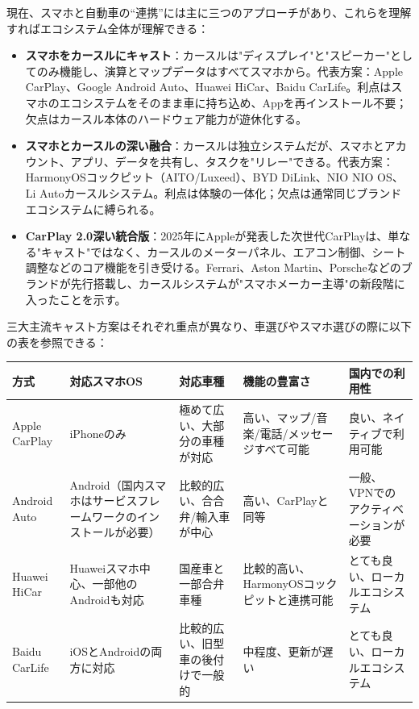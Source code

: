 


現在、スマホと自動車の“連携”には主に三つのアプローチがあり、これらを理解すればエコシステム全体が理解できる：

\begin{itemize}
  \item \textbf{スマホをカースルにキャスト}：カースルは"ディスプレイ"と"スピーカー"としてのみ機能し、演算とマップデータはすべてスマホから。代表方案：Apple CarPlay、Google Android Auto、Huawei HiCar、Baidu CarLife。利点はスマホのエコシステムをそのまま車に持ち込め、Appを再インストール不要；欠点はカースル本体のハードウェア能力が遊休化する。
  \item \textbf{スマホとカースルの深い融合}：カースルは独立システムだが、スマホとアカウント、アプリ、データを共有し、タスクを"リレー"できる。代表方案：HarmonyOSコックピット（AITO/Luxeed）、BYD DiLink、NIO NIO OS、Li Autoカースルシステム。利点は体験の一体化；欠点は通常同じブランドエコシステムに縛られる。
  \item \textbf{CarPlay 2.0深い統合版}：2025年にAppleが発表した次世代CarPlayは、単なる"キャスト"ではなく、カースルのメーターパネル、エアコン制御、シート調整などのコア機能を引き受ける。Ferrari、Aston Martin、Porscheなどのブランドが先行搭載し、カースルシステムが"スマホメーカー主導"の新段階に入ったことを示す。
\end{itemize}


三大主流キャスト方案はそれぞれ重点が異なり、車選びやスマホ選びの際に以下の表を参照できる：

\begin{center}
\begin{tabularx}{\linewidth}{|X|X|X|X|X|}
\hline
\textbf{方式} & \textbf{対応スマホOS} & \textbf{対応車種} & \textbf{機能の豊富さ} & \textbf{国内での利用性} \tabularnewline
\hline
Apple CarPlay & iPhoneのみ & 極めて広い、大部分の車種が対応 & 高い、マップ/音楽/電話/メッセージすべて可能 & 良い、ネイティブで利用可能 \tabularnewline
Android Auto & Android（国内スマホはサービスフレームワークのインストールが必要） & 比較的広い、合合弁/輸入車が中心 & 高い、CarPlayと同等 & 一般、VPNでのアクティベーションが必要 \tabularnewline
Huawei HiCar & Huaweiスマホ中心、一部他のAndroidも対応 & 国産車と一部合弁車種 & 比較的高い、HarmonyOSコックピットと連携可能 & とても良い、ローカルエコシステム \tabularnewline
Baidu CarLife & iOSとAndroidの両方に対応 & 比較的広い、旧型車の後付けで一般的 & 中程度、更新が遅い & とても良い、ローカルエコシステム \tabularnewline
\hline
\end{tabularx}
\end{center}

